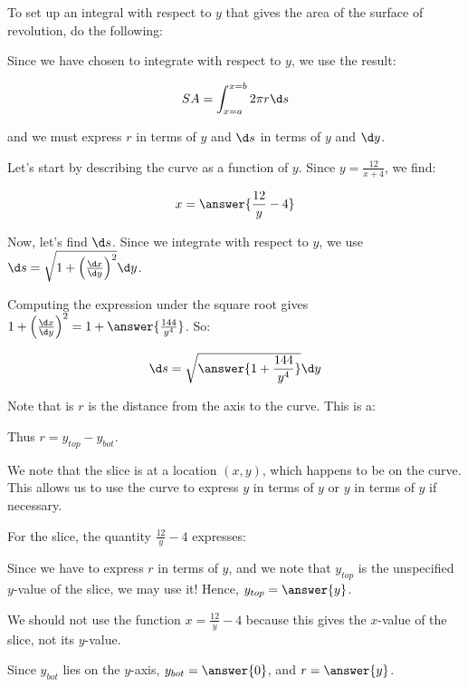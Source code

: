 \documentclass{ximera}
\begin{document}
\begin{exercise}
To set up an integral with respect to $y$ that gives the area of the surface of revolution, do the following:  

Since we have chosen to integrate with respect to $y$, we use the result:

\[ SA = \int_{x=a}^{x=b} 2 \pi r \d s\]

and we must express $r$ in terms of $y$ and $\d s$ in terms of $y$ and $\d y$.  


Let's start by describing the curve as a function of $y$.  Since $y=\frac{12}{x+4}$, we find:

\[
x= \answer{\frac{12}{y}-4}
\]

Now, let's find $\d s$.  Since we integrate with respect to $y$, we use $\d s = \sqrt{1+\left(\frac{\d x}{\d y}\right)^2} \d y$.

Computing the expression under the square root gives $1+\left(\frac{\d x}{\d y}\right)^2 = 1+\answer{\frac{144}{y^4}}$.  So: 

\[
\d s = \sqrt{\answer{1+\frac{144}{y^4}}} \d y
\]


\begin{exercise}
Note that is $r$ is the distance from the axis to the curve. This is a:

\begin{multipleChoice}
\end{multipleChoice} 
Thus $r=y_{top}-y_{bot}$.  

We note that the slice is at a location $(x,y)$, which happens to be on the curve.  This allows us to use the curve to express $y$ in terms of $y$ or $y$ in terms of $y$ if necessary.  

For the slice, the quantity $\frac{12}{y}-4$ expresses:
\begin{multipleChoice}
\end{multipleChoice} 

Since we have to express $r$ in terms of $y$, and we note that $y_{top}$ is the unspecified $y$-value of the slice, we may use it!  Hence, $y_{top} = \answer{y}$.

\begin{feedback}
We should not use the function $x=\frac{12}{y}-4$ because this gives the $x$-value of the slice, not its $y$-value.
\end{feedback}

Since $y_{bot}$ lies on the $y$-axis, $y_{bot} = \answer{0}$, and $r= \answer{y}$.


\end{exercise}
\end{exercise}
\end{document}
